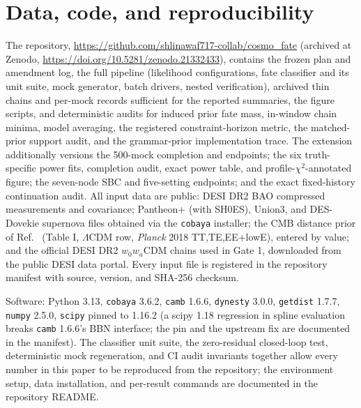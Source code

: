 \documentclass[a4paper,11pt]{article}
\newcommand{\lcdm}{\ensuremath{\Lambda\mathrm{CDM}}}
\begin{document}
\section{Data, code, and reproducibility}\label{app:repro}

The repository, \url{https://github.com/shlinawaf717-collab/cosmo_fate}
(archived at Zenodo, \url{https://doi.org/10.5281/zenodo.21332433}),
contains the frozen plan and amendment log, the full pipeline (likelihood configurations,
fate classifier and its unit suite, mock generator, batch drivers, nested
verification), archived thin chains and per-mock records sufficient for the
reported summaries, the figure scripts, and
deterministic audits for induced prior fate mass, in-window chain minima,
model averaging, the registered constraint-horizon metric, the matched-prior
support audit, and the grammar-prior implementation trace. The extension
additionally versions the 500-mock completion and endpoints; the six
truth-specific power fits, completion audit, exact power table, and
profile-$\chi^2$-annotated figure; the seven-node SBC and five-setting
endpoints; and the exact fixed-history continuation audit. All
input data are public: DESI DR2 BAO compressed measurements and covariance;
Pantheon+ (with SH0ES), Union3, and DES-Dovekie supernova files obtained via
the \texttt{cobaya} installer; the CMB distance prior of
Ref.~\cite{ChenHuangWang2018} (Table I, \lcdm{} row, \textit{Planck} 2018
TT,TE,EE+lowE), entered by value; and the official DESI DR2
$w_0w_a$CDM chains used in Gate 1, downloaded from the public DESI data
portal. Every input file is registered in the repository manifest with
source, version, and SHA-256 checksum.

Software: Python 3.13, \texttt{cobaya} 3.6.2, \texttt{camb} 1.6.6,
\texttt{dynesty} 3.0.0, \texttt{getdist} 1.7.7, \texttt{numpy} 2.5.0,
\texttt{scipy} pinned to 1.16.2 (a scipy 1.18 regression in spline
evaluation breaks \texttt{camb} 1.6.6's BBN interface; the pin and the
upstream fix are documented in the manifest). The classifier unit suite, the
zero-residual closed-loop test, deterministic mock regeneration, and CI audit
invariants
together allow every number in this paper to be reproduced from the
repository; the environment setup, data installation, and per-result
commands are documented in the repository README.



\end{document}
